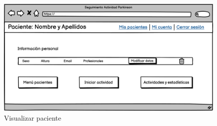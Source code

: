 \begin{figure}[h]
    \centering
    \includegraphics[width=1\textwidth]{img/UI_Wireframes/UI_CU-30_Visualizar paciente.png}
    \caption{Visualizar paciente}
    \label{fig:Visualizar paciente}
\end{figure}